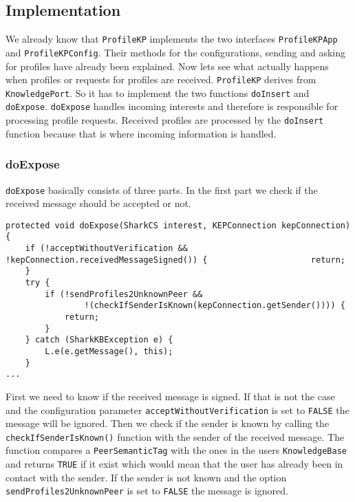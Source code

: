 \subsection{Implementation} 
We already know that {\tt ProfileKP} implements the two interfaces {\tt ProfileKPApp} and {\tt ProfileKPConfig}. Their methods for the configurations, sending and asking for profiles have already been explained. Now lets see what actually happens when profiles or requests for profiles are received. 
{\tt ProfileKP} derives from {\tt KnowledgePort}. So it has to implement the two functions {\tt doInsert} and {\tt doExpose}. {\tt doExpose} handles incoming interests and therefore is responsible for processing profile requests. Received profiles are processed by the {\tt doInsert} function because that is where incoming information is handled.

\subsubsection{doExpose}
{\tt doExpose} basically consists of three parts. In the first part we check if the received message should be accepted or not.

\begin{verbatim}
protected void doExpose(SharkCS interest, KEPConnection kepConnection) {
    if (!acceptWithoutVerification && !kepConnection.receivedMessageSigned()) { 					return; 
    }
    try {
        if (!sendProfiles2UnknownPeer && 
        		!(checkIfSenderIsKnown(kepConnection.getSender()))) { 
			return;
		}
    } catch (SharkKBException e) {
        L.e(e.getMessage(), this);
    }
...
\end{verbatim}

First we need to know if the received message is signed. If that is not the case and the configuration parameter {\tt acceptWithoutVerification} is set to {\tt FALSE} the message will be ignored.
Then we check if the sender is known by calling the {\tt checkIfSenderIsKnown()} function with the sender of the received message. The function compares a {\tt PeerSemanticTag} with the ones in the users {\tt KnowledgeBase} and returns {\tt TRUE} if it exist which would mean that the user has already been in contact with the sender. If the sender is not known and the option {\tt sendProfiles2UnknownPeer} is set to {\tt FALSE} the message is ignored.

